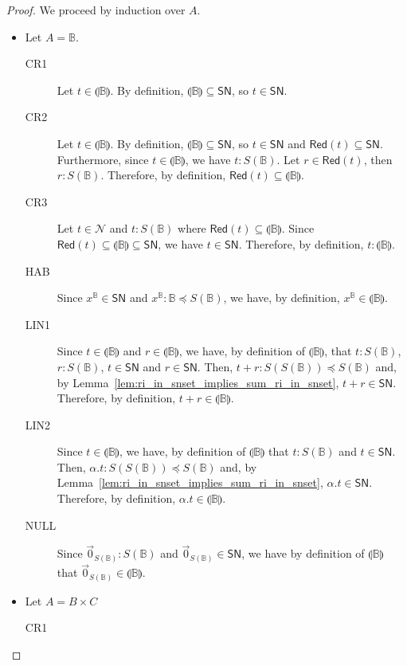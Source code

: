 \documentclass[preprint]{elsarticle}
\newcommand\interp[1]{\llparenthesis #1\rrparenthesis}
\newcommand\Red[1]{\mathsf{Red}(#1)}
\newcommand\SN{\mathsf{SN}}
\newcommand\B{\ensuremath{\mathbb B}}
\newcommand\z[1][A]{\vec 0_{S(#1)}}
\newcommand\nullvec[1]{\z[#1]}
\begin{document}
\begin{proof}
  We proceed by induction over \( A \).
  \begin{itemize}
    \item Let \( A = \B \).
    \begin{description}
      \item[CR1]
       Let \( t \in \interp{\B} \). By definition, \( \interp{\B} \subseteq \SN \), so \( t \in \SN \).
      \item[CR2]
       Let \( t \in \interp{\B} \). By definition, \( \interp{\B} \subseteq
      \SN \), so \( t \in \SN \) and \( \Red{t} \subseteq \SN \). Furthermore,
      since \( t \in \interp{\B} \), we have \(  t : S(\B) \). Let \( r
      \in \Red{t} \), then \(  r : S(\B) \). Therefore, by definition, \( \Red{t} \subseteq \interp{\B} \).
      \item[CR3]
       Let \( t \in \mathcal{N} \) and $t:S(\B)$ where \( \Red{t} \subseteq \interp{\B} \).
      Since \( \Red{t} \subseteq \interp{\B} \subseteq \SN \), we have \( t \in
      \SN \).
      Therefore, by definition, \(
       t : \interp{\B} \).
      \item[HAB]
       Since \(  x^{\B} \in \SN \) and \(  x^{\B} : \B \preceq S(\B) \), we have, by definition, \( x^{\B} \in \interp{\B} \).
      \item[LIN1]
       Since \( t \in \interp{\B} \) and \( r \in \interp{\B} \), we have, by definition of \( \interp{\B} \), that \( t : S(\B) \), \( r : S(\B) \), \( t \in \SN \) and \( r \in \SN \). Then, \( t + r : S(S(\B)) \preceq S(\B) \) and, by Lemma~\ref{lem:ri_in_snset_implies_sum_ri_in_snset}, \( t + r \in \SN \). Therefore, by definition, \( t + r \in \interp{\B} \).
      \item[LIN2]
       Since \( t \in \interp{\B} \), we have, by definition of \( \interp{\B} \) that \( t : S(\B) \) and \( t \in \SN \). Then, \( \alpha . t : S(S(\B)) \preceq S(\B) \) and, by Lemma~\ref{lem:ri_in_snset_implies_sum_ri_in_snset}, \( \alpha . t \in \SN \). Therefore, by definition, \( \alpha . t \in \interp{\B} \).
      \item[NULL]
       Since \( \nullvec{\B} : S(\B) \) and \( \nullvec{\B} \in \SN \), we have by definition of \( \interp{\B} \) that \( \nullvec{\B} \in \interp{\B} \).
    \end{description}
    \item Let \( A = B \times C \)
    \begin{description}
      \item[CR1]

\end{description}
\end{itemize}
\end{proof}
\end{document}

